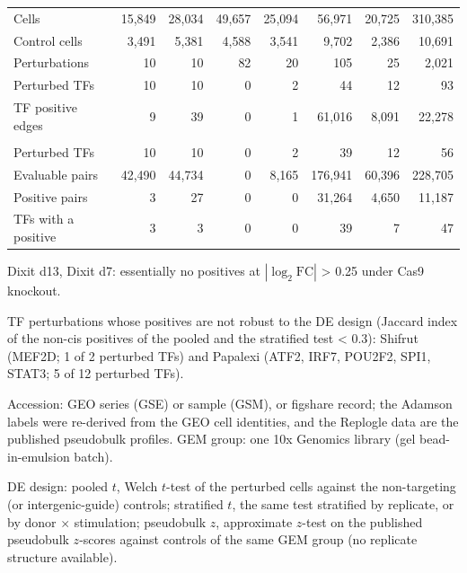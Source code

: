 \documentclass[11pt,a4paper]{article}
\providecommand{\DIFaddend}{} %
\DeclareRobustCommand{\DIFaddend}{\DIFOaddend \let\includegraphics\DIFOincludegraphics} %
\begin{document}
\begin{table}[tbp]
\begin{tabular}{@{}lrrrrrrr@{}}
Cells & 15{,}849 & 28{,}034 & 49{,}657 & 25{,}094 & 56{,}971 & 20{,}725 & 310{,}385 \\
Control cells & 3{,}491 & 5{,}381 & 4{,}588 & 3{,}541 & 9{,}702 & 2{,}386 & 10{,}691 \\
Perturbations & 10 & 10 & 82 & 20 & 105 & 25 & 2{,}021 \\
Perturbed TFs & 10 & 10 & 0 & 2 & 44 & 12 & 93 \\
TF positive edges & 9 & 39 & 0 & 1 & 61{,}016 & 8{,}091 & 22{,}278 \\
\addlinespace[3pt]
\multicolumn{8}{@{}l}{\emph{Global universe}} \\
Perturbed TFs & 10 & 10 & 0 & 2 & 39 & 12 & 56 \\
Evaluable pairs & 42{,}490 & 44{,}734 & 0 & 8{,}165 & 176{,}941 & 60{,}396 & 228{,}705 \\
Positive pairs & 3 & 27 & 0 & 0 & 31{,}264 & 4{,}650 & 11{,}187 \\
TFs with a positive & 3 & 3 & 0 & 0 & 39 & 7 & 47 \\
\bottomrule
\end{tabular}
\par\smallskip
\begin{minipage}{\linewidth}\footnotesize
Dixit d13, Dixit d7: essentially no positives at $|\log_2\mathrm{FC}|$ > 0.25 under Cas9 knockout.

TF perturbations whose positives are not robust to the DE design (Jaccard index of the non-cis positives of the pooled and the stratified test < 0.3): Shifrut (MEF2D; 1 of 2 perturbed TFs) and Papalexi (ATF2, IRF7, POU2F2, SPI1, STAT3; 5 of 12 perturbed TFs).

Accession: GEO series (GSE) or sample (GSM), or figshare record; the Adamson labels were re-derived from the GEO cell identities, and the Replogle data are the published pseudobulk profiles. GEM group: one 10x Genomics library (gel bead-in-emulsion batch).

DE design: pooled $t$, Welch $t$-test of the perturbed cells against the non-targeting (or intergenic-guide) controls; stratified $t$, the same test stratified by replicate, or by donor $\times$ stimulation; pseudobulk $z$, approximate $z$-test on the published pseudobulk $z$-scores against controls of the same GEM group (no replicate structure available).
\end{minipage}
\end{table}
\DIFaddend 
\end{document}
